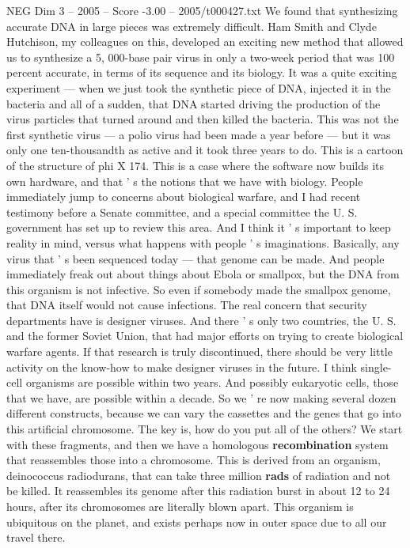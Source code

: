 \begin{textsample}{NEG Dim 3 – 2005 – Score -3.00 – 2005/t000427.txt}
We found that synthesizing accurate DNA in large pieces was extremely difficult.
Ham Smith and Clyde Hutchison, my colleagues on this, developed an exciting new method that allowed us to synthesize a 5, 000-base pair virus in only a two-week period that was 100 percent accurate, in terms of its sequence and its biology.
It was a quite exciting experiment — when we just took the synthetic piece of DNA, injected it in the bacteria and all of a sudden, that DNA started driving the production of the virus particles that turned around and then killed the bacteria.
This was not the first synthetic virus — a polio virus had been made a year before — but it was only one ten-thousandth as active and it took three years to do.
This is a cartoon of the structure of phi X 174.
This is a case where the software now builds its own hardware, and that ' s the notions that we have with biology.
People immediately jump to concerns about biological warfare, and I had recent testimony before a Senate committee, and a special committee the U.
S. government has set up to review this area.
And I think it ' s important to keep reality in mind, versus what happens with people ' s imaginations.
Basically, any virus that ' s been sequenced today — that genome can be made.
And people immediately freak out about things about Ebola or smallpox, but the DNA from this organism is not infective.
So even if somebody made the smallpox genome, that DNA itself would not cause infections.
The real concern that security departments have is designer viruses.
And there ' s only two countries, the U.
S. and the former Soviet Union, that had major efforts on trying to create biological warfare agents.
If that research is truly discontinued, there should be very little activity on the know-how to make designer viruses in the future.
I think single-cell organisms are possible within two years.
And possibly eukaryotic cells, those that we have, are possible within a decade.
So we ' re now making several dozen different constructs, because we can vary the cassettes and the genes that go into this artificial chromosome.
The key is, how do you put all of the others?
We start with these fragments, and then we have a homologous \textbf{recombination} system that reassembles those into a chromosome.
This is derived from an organism, deinococcus radiodurans, that can take three million \textbf{rads} of radiation and not be killed.
It reassembles its genome after this radiation burst in about 12 to 24 hours, after its chromosomes are literally blown apart.
This organism is ubiquitous on the planet, and exists perhaps now in outer space due to all our travel there.

\end{textsample}
